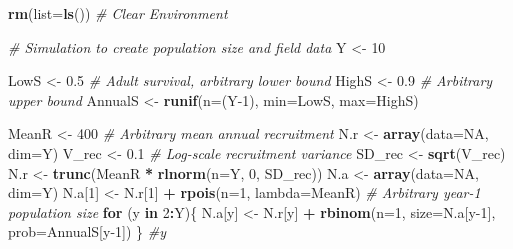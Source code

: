 \documentclass[
]{krantz}
\makeatletter
\newenvironment{Shaded}{\begin{snugshade}}{\end{snugshade}}
\newcommand{\AttributeTok}[1]{\textcolor[rgb]{0.27,0.27,0.27}{#1}}
\newcommand{\CommentTok}[1]{\textcolor[rgb]{0.37,0.37,0.37}{\textit{#1}}}
\newcommand{\ConstantTok}[1]{\textcolor[rgb]{0.37,0.37,0.37}{#1}}
\newcommand{\ControlFlowTok}[1]{\textcolor[rgb]{0.27,0.27,0.27}{\textbf{#1}}}
\newcommand{\DecValTok}[1]{\textcolor[rgb]{0.06,0.06,0.06}{#1}}
\newcommand{\FloatTok}[1]{\textcolor[rgb]{0.06,0.06,0.06}{#1}}
\newcommand{\FunctionTok}[1]{\textcolor[rgb]{0.27,0.27,0.27}{\textbf{#1}}}
\newcommand{\NormalTok}[1]{#1}
\newcommand{\OtherTok}[1]{\textcolor[rgb]{0.37,0.37,0.37}{#1}}
\newcommand{\SpecialCharTok}[1]{\textcolor[rgb]{0.43,0.43,0.43}{\textbf{#1}}}
\newenvironment{kframe}{%
\medskip{}
\setlength{\fboxsep}{.8em}
 \def\at@end@of@kframe{}%
 \ifinner\ifhmode%
  \def\at@end@of@kframe{\end{minipage}}%
  \begin{minipage}{\columnwidth}%
 \fi\fi%
 \def\FrameCommand##1{\hskip\@totalleftmargin \hskip-\fboxsep
 \colorbox{shadecolor}{##1}\hskip-\fboxsep
     \hskip-\linewidth \hskip-\@totalleftmargin \hskip\columnwidth}%
 \MakeFramed {\advance\hsize-\width
   \@totalleftmargin\z@ \linewidth\hsize
   \@setminipage}}%
 {\par\unskip\endMakeFramed%
 \at@end@of@kframe}
\renewenvironment{Shaded}{\begin{kframe}}{\end{kframe}}
\makeatother
\begin{document}
\begin{Shaded}
\begin{Highlighting}[]
\FunctionTok{rm}\NormalTok{(}\AttributeTok{list=}\FunctionTok{ls}\NormalTok{()) }\CommentTok{\# Clear Environment}

\CommentTok{\# Simulation to create population size and field data}
\NormalTok{Y }\OtherTok{\textless{}{-}} \DecValTok{10}

\NormalTok{LowS }\OtherTok{\textless{}{-}} \FloatTok{0.5} \CommentTok{\# Adult survival, arbitrary lower bound}
\NormalTok{HighS }\OtherTok{\textless{}{-}} \FloatTok{0.9} \CommentTok{\# Arbitrary upper bound}
\NormalTok{AnnualS }\OtherTok{\textless{}{-}} \FunctionTok{runif}\NormalTok{(}\AttributeTok{n=}\NormalTok{(Y}\DecValTok{{-}1}\NormalTok{), }\AttributeTok{min=}\NormalTok{LowS, }\AttributeTok{max=}\NormalTok{HighS)}

\NormalTok{MeanR }\OtherTok{\textless{}{-}} \DecValTok{400} \CommentTok{\# Arbitrary mean annual recruitment}
\NormalTok{N.r }\OtherTok{\textless{}{-}} \FunctionTok{array}\NormalTok{(}\AttributeTok{data=}\ConstantTok{NA}\NormalTok{, }\AttributeTok{dim=}\NormalTok{Y)}
\NormalTok{V\_rec }\OtherTok{\textless{}{-}} \FloatTok{0.1} \CommentTok{\# Log{-}scale recruitment variance}
\NormalTok{SD\_rec }\OtherTok{\textless{}{-}} \FunctionTok{sqrt}\NormalTok{(V\_rec)}
\NormalTok{N.r }\OtherTok{\textless{}{-}} \FunctionTok{trunc}\NormalTok{(MeanR }\SpecialCharTok{*} \FunctionTok{rlnorm}\NormalTok{(}\AttributeTok{n=}\NormalTok{Y, }\DecValTok{0}\NormalTok{, SD\_rec))}
\NormalTok{N.a }\OtherTok{\textless{}{-}} \FunctionTok{array}\NormalTok{(}\AttributeTok{data=}\ConstantTok{NA}\NormalTok{, }\AttributeTok{dim=}\NormalTok{Y)}
\NormalTok{N.a[}\DecValTok{1}\NormalTok{] }\OtherTok{\textless{}{-}}\NormalTok{ N.r[}\DecValTok{1}\NormalTok{] }\SpecialCharTok{+} \FunctionTok{rpois}\NormalTok{(}\AttributeTok{n=}\DecValTok{1}\NormalTok{, }\AttributeTok{lambda=}\NormalTok{MeanR) }
  \CommentTok{\# Arbitrary year{-}1 population size}
\ControlFlowTok{for}\NormalTok{ (y }\ControlFlowTok{in} \DecValTok{2}\SpecialCharTok{:}\NormalTok{Y)\{}
\NormalTok{  N.a[y] }\OtherTok{\textless{}{-}}\NormalTok{ N.r[y] }\SpecialCharTok{+} \FunctionTok{rbinom}\NormalTok{(}\AttributeTok{n=}\DecValTok{1}\NormalTok{, }\AttributeTok{size=}\NormalTok{N.a[y}\DecValTok{{-}1}\NormalTok{], }\AttributeTok{prob=}\NormalTok{AnnualS[y}\DecValTok{{-}1}\NormalTok{])}
\NormalTok{\} }\CommentTok{\#y}


\end{Highlighting}
\end{Shaded}
\end{document}
